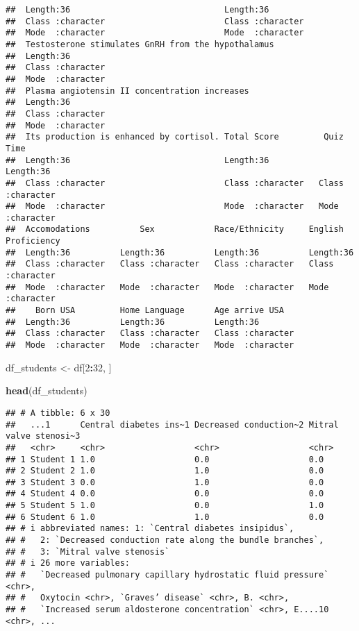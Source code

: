\documentclass[
]{article}
\newenvironment{Shaded}{\begin{snugshade}}{\end{snugshade}}
\newcommand{\DecValTok}[1]{\textcolor[rgb]{0.00,0.00,0.81}{#1}}
\newcommand{\FunctionTok}[1]{\textcolor[rgb]{0.13,0.29,0.53}{\textbf{#1}}}
\newcommand{\NormalTok}[1]{#1}
\newcommand{\OtherTok}[1]{\textcolor[rgb]{0.56,0.35,0.01}{#1}}
\newcommand{\SpecialCharTok}[1]{\textcolor[rgb]{0.81,0.36,0.00}{\textbf{#1}}}
\begin{document}
\begin{verbatim}
##  Length:36                               Length:36                
##  Class :character                        Class :character         
##  Mode  :character                        Mode  :character         
##  Testosterone stimulates GnRH from the hypothalamus
##  Length:36                                         
##  Class :character                                  
##  Mode  :character                                  
##  Plasma angiotensin II concentration increases
##  Length:36                                    
##  Class :character                             
##  Mode  :character                             
##  Its production is enhanced by cortisol. Total Score         Quiz Time        
##  Length:36                               Length:36          Length:36         
##  Class :character                        Class :character   Class :character  
##  Mode  :character                        Mode  :character   Mode  :character  
##  Accomodations          Sex            Race/Ethnicity     English Proficiency
##  Length:36          Length:36          Length:36          Length:36          
##  Class :character   Class :character   Class :character   Class :character   
##  Mode  :character   Mode  :character   Mode  :character   Mode  :character   
##    Born USA         Home Language      Age arrive USA    
##  Length:36          Length:36          Length:36         
##  Class :character   Class :character   Class :character  
##  Mode  :character   Mode  :character   Mode  :character
\end{verbatim}

\begin{Shaded}
\begin{Highlighting}[]
\NormalTok{df\_students }\OtherTok{\textless{}{-}}\NormalTok{ df[}\DecValTok{2}\SpecialCharTok{:}\DecValTok{32}\NormalTok{, ]}

\FunctionTok{head}\NormalTok{(df\_students)}
\end{Highlighting}
\end{Shaded}

\begin{verbatim}
## # A tibble: 6 x 30
##   ...1      Central diabetes ins~1 Decreased conduction~2 Mitral valve stenosi~3
##   <chr>     <chr>                  <chr>                  <chr>                 
## 1 Student 1 1.0                    0.0                    0.0                   
## 2 Student 2 1.0                    1.0                    0.0                   
## 3 Student 3 0.0                    1.0                    0.0                   
## 4 Student 4 0.0                    0.0                    0.0                   
## 5 Student 5 1.0                    0.0                    1.0                   
## 6 Student 6 1.0                    1.0                    0.0                   
## # i abbreviated names: 1: `Central diabetes insipidus`,
## #   2: `Decreased conduction rate along the bundle branches`,
## #   3: `Mitral valve stenosis`
## # i 26 more variables:
## #   `Decreased pulmonary capillary hydrostatic fluid pressure` <chr>,
## #   Oxytocin <chr>, `Graves’ disease` <chr>, B. <chr>,
## #   `Increased serum aldosterone concentration` <chr>, E....10 <chr>, ...
\end{verbatim}
\end{document}
